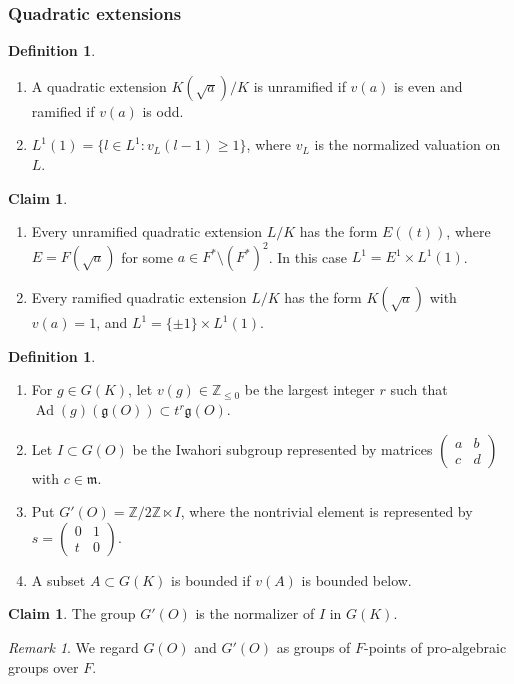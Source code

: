 \documentclass[11pt,a4paper,twoside]{amsart}
\theoremstyle{definition}
\newtheorem{definition}[theorem]{Definition}
\newtheorem{claim}[theorem]{Claim}
\theoremstyle{remark}
\newtheorem{remark}[theorem]{Remark}
\newcommand{\ZZ}{\mathbb Z}
\newcommand{\fg}{\mathfrak g}
\newcommand{\fm}{\mathfrak m}
\newcommand{\sm}{\setminus}
\newcommand{\Ad}{\operatorname{Ad}}
\begin{document}
\subsubsection{Quadratic extensions}
\begin{definition}
\begin{enumerate}
\item A quadratic extension $K(\sqrt a)/K$ is unramified if $v(a)$ is even and ramified if $v(a)$ is odd.
\item $L^1(1)=\{l\in L^1:v_L(l-1)\geq1\}$, where $v_L$ is the normalized valuation on $L$.
\end{enumerate}
\end{definition}
\begin{claim}\label{quad-LK}
\begin{enumerate}
\item Every unramified quadratic extension $L/K$ has the form $E((t))$, where $E=F(\sqrt a)$ for some $a\in F^*\sm(F^*)^2$. In this case $L^1=E^1\times L^1(1)$.
\item Every ramified quadratic extension $L/K$ has the form $K(\sqrt a)$ with $v(a)=1$, and $L^1=\{\pm1\}\times L^1(1)$.
\end{enumerate}
\end{claim}
\begin{definition}\label{G-O-def}
\begin{enumerate}
\item For $g\in G(K)$, let $v(g)\in\ZZ_{\leq0}$ be the largest integer $r$ such that $\Ad(g)(\fg(O))\subset t^r\fg(O)$.
\item Let $I\subset G(O)$ be the Iwahori subgroup represented by matrices $\begin{pmatrix}a&b\\c&d\end{pmatrix}$ with $c\in\fm$.
\item Put $G'(O)=\ZZ/2\ZZ\ltimes I$, where the nontrivial element is represented by $s=\begin{pmatrix}0&1\\t&0\end{pmatrix}$.
\item A subset $A\subset G(K)$ is bounded if $v(A)$ is bounded below.
\end{enumerate}
\end{definition}
\begin{claim}
The group $G'(O)$ is the normalizer of $I$ in $G(K)$.
\end{claim}
\begin{remark}
We regard $G(O)$ and $G'(O)$ as groups of $F$-points of pro-algebraic groups over $F$.
\end{remark}
\end{document}
